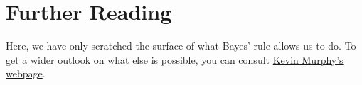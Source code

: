 \section*{Further Reading}
Here, we have only scratched the surface of what Bayes' rule allows us to do. To get a wider outlook on what else is possible,
you can consult \href{http://www.cs.ubc.ca/~murphyk/Bayes/bayesrule.html}{Kevin Murphy's webpage}.

